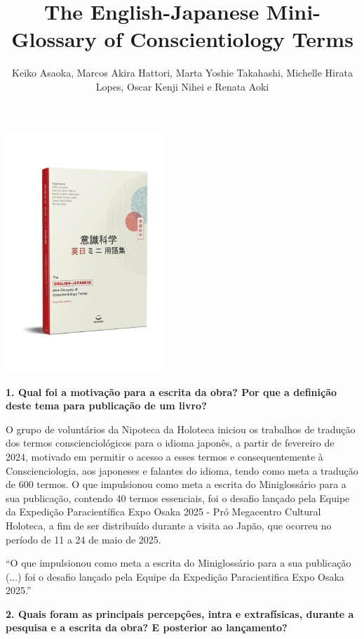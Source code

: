 \documentclass{gescons}
\author{Keiko Asaoka, Marcos Akira Hattori, Marta Yoshie Takahashi, Michelle Hirata Lopes, Oscar Kenji Nihei e Renata Aoki}
\title{The English-Japanese Mini-Glossary of Conscientiology Terms}
\begin{document}
    \makeentrevistatitle

    \begin{multicols}{2}

\begin{center}
    \vspace{-0.5cm}
    \includegraphics[width=6cm]{articles/entrevista/mockups/Mini-Glossary.png}
\end{center}


\textbf{1. Qual foi a motivação para a escrita da obra? Por que a definição deste tema para publicação de um livro?}

O grupo de voluntários da Nipoteca da Holoteca iniciou os trabalhos de tradução dos termos conscienciológicos para o idioma japonês, a partir de fevereiro de 2024, motivado em permitir o acesso a esses termos e consequentemente à Conscienciologia, aos japoneses e falantes do idioma, tendo como meta a tradução de 600 termos. O que impulsionou como meta a escrita do Miniglossário para a sua publicação, contendo 40 termos essenciais, foi o desafio lançado pela Equipe da Expedição Paracientífica Expo Osaka 2025 - Pró Megacentro Cultural Holoteca, a fim de ser distribuído durante a visita ao Japão, que ocorreu no período de 11 a 24 de maio de 2025.

\begin{pullquote}
    ``O que impulsionou como meta a escrita do Miniglossário para a sua publicação (...) foi o desafio lançado pela Equipe da Expedição Paracientifica Expo Osaka 2025.''
\end{pullquote}

\textbf{2. Quais foram as principais percepções, intra e extrafísicas, durante a pesquisa e a escrita da obra? E posterior ao lançamento?}



\end{multicols}
\end{document}
